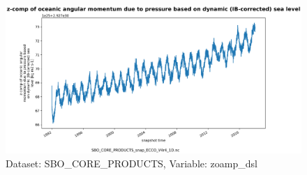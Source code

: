 \begin{figure}[H]
\centering
\includegraphics[scale=0.55]{../images/plots/oneD_plots/SBO_Core_Products/zoamp_dsl.png}
\caption{Dataset: SBO\_CORE\_PRODUCTS, Variable: zoamp\_dsl}
\label{tab:table-SBO_CORE_PRODUCTS_zoamp_dsl-Plot}
\end{figure}
\newpage
\pagebreak

